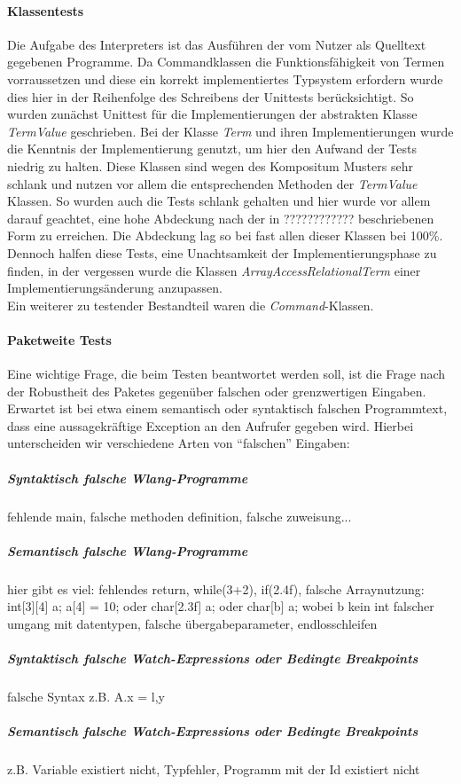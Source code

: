\documentclass[parskip=full]{scrartcl}
\begin{document}
\paragraph{Klassentests}
Die Aufgabe des Interpreters ist das Ausführen der vom Nutzer als Quelltext gegebenen Programme. 
Da Commandklassen die Funktionsfähigkeit von Termen vorraussetzen und diese ein korrekt implementiertes Typsystem erfordern wurde dies hier in der Reihenfolge des Schreibens der Unittests berücksichtigt. 
So wurden zunächst Unittest für die Implementierungen der abstrakten Klasse \textit{TermValue} geschrieben.
Bei der Klasse \textit{Term} und ihren Implementierungen wurde die Kenntnis der Implementierung genutzt, um hier den Aufwand der Tests niedrig zu halten. Diese Klassen sind wegen des Kompositum Musters sehr schlank und nutzen vor allem die entsprechenden Methoden der \textit{TermValue} Klassen. So wurden auch die Tests schlank gehalten und hier wurde vor allem darauf geachtet, eine hohe Abdeckung nach der in %
 ???????????? beschriebenen Form zu erreichen. Die Abdeckung lag so bei fast allen dieser Klassen bei 100\%. Dennoch halfen diese Tests, eine Unachtsamkeit der Implementierungsphase zu finden, in der vergessen wurde die Klassen \textit{ArrayAccessRelationalTerm} einer Implementierungsänderung anzupassen.\\
Ein weiterer zu testender Bestandteil waren die \textit{Command}-Klassen. 
\paragraph{Paketweite Tests}
Eine wichtige Frage, die beim Testen beantwortet werden soll, ist die Frage nach der Robustheit des Paketes gegenüber falschen oder grenzwertigen Eingaben. Erwartet ist bei etwa einem semantisch oder syntaktisch falschen Programmtext, dass eine aussagekräftige Exception an den Aufrufer gegeben wird. Hierbei unterscheiden wir verschiedene Arten von \enquote{falschen} Eingaben:
\subparagraph{Syntaktisch falsche Wlang-Programme}
fehlende main, falsche methoden definition, falsche zuweisung...
\subparagraph{Semantisch falsche Wlang-Programme}
hier gibt es viel: 
fehlendes return, while(3+2), if(2.4f), falsche Arraynutzung: int[3][4] a; a[4] = 10; oder char[2.3f] a; oder char[b] a; wobei b kein int
falscher umgang mit datentypen, falsche übergabeparameter, endlosschleifen
\subparagraph{Syntaktisch falsche Watch-Expressions oder Bedingte Breakpoints}
falsche Syntax z.B. A.x = l,y
\subparagraph{Semantisch falsche Watch-Expressions oder Bedingte Breakpoints}
z.B. Variable existiert nicht, Typfehler, Programm mit der Id existiert nicht
\end{document}
